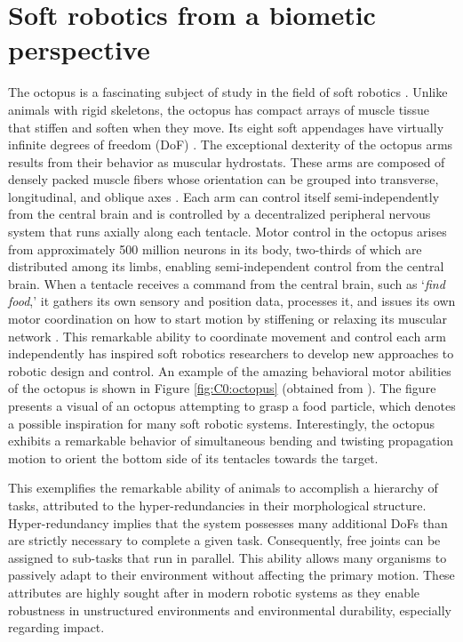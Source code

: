 \section{Soft robotics from a biometic perspective}
The octopus is a fascinating subject of study in the field of soft robotics \cite{Renda2018, Wehner2016, Kim2019Aug, Laschi2014, Rus2015, Mochiyama1999, Chang2022}. Unlike animals with rigid skeletons, the octopus has compact arrays of muscle tissue that stiffen and soften when they move. Its eight soft appendages have virtually infinite degrees of freedom (DoF) \cite{Sumbre2001Sep, Kier1985, Kennedy2020Nov}. The exceptional dexterity of the octopus arms results from their behavior as muscular hydrostats. These arms are composed of densely packed muscle fibers whose orientation can be grouped into transverse, longitudinal, and oblique axes \cite{Kier2007Oct}. Each arm can control itself semi-independently from the central brain and is controlled by a decentralized peripheral nervous system that runs axially along each tentacle. Motor control in the octopus arises from approximately 500 million neurons in its body, two-thirds of which are distributed among its limbs, enabling semi-independent control from the central brain. When a tentacle receives a command from the central brain, such as `\textit{find food},' it gathers its own sensory and position data, processes it, and issues its own motor coordination on how to start motion by stiffening or relaxing its muscular network \cite{Kier1985, Sumbre2001Sep}. This remarkable ability to coordinate movement and control each arm independently has inspired soft robotics researchers to develop new approaches to robotic design and control. An example of the amazing behavioral motor abilities of the octopus is shown in Figure \ref{fig:C0:octopus} (obtained from \cite{Sumbre2001Sep}). The figure presents a visual of an octopus attempting to grasp a food particle, which denotes a possible inspiration for many soft robotic systems. Interestingly, the octopus exhibits a remarkable behavior of simultaneous bending and twisting propagation motion to orient the bottom side of its tentacles towards the target.

This exemplifies the remarkable ability of animals to accomplish a hierarchy of tasks, attributed to the hyper-redundancies in their morphological structure. Hyper-redundancy \cite{Chirikjian1989, Chirikjian1991, Rus2015} implies that the system possesses many additional DoFs than are strictly necessary to complete a given task. Consequently, free joints can be assigned to sub-tasks that run in parallel. This ability allows many organisms to passively adapt to their environment without affecting the primary motion. These attributes are highly sought after in modern robotic systems \cite{Spong1996, Murray1994, DeLuca2016Jul} as they enable robustness in unstructured environments and environmental durability, especially regarding impact.

